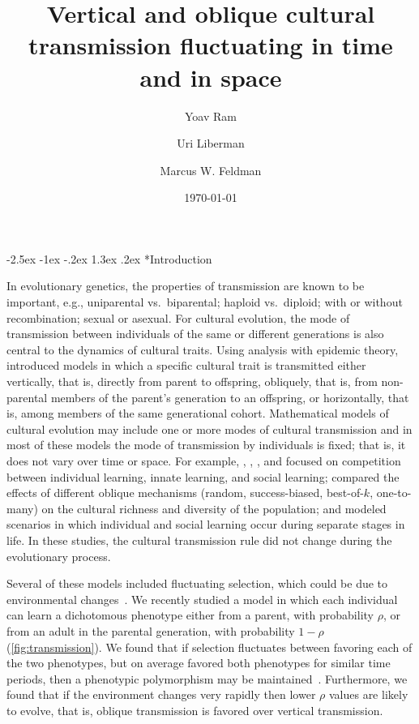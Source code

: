 \documentclass[14pt]{extarticle}
\title{Vertical and oblique cultural transmission fluctuating in time and in space}
\author[a]{Yoav Ram}
\author[b]{Uri Liberman}
\author[a]{Marcus W. Feldman}
\affil[a]{Department of Biology, Stanford University, Stanford, CA}
\affil[b]{School of Mathematical Sciences, Tel Aviv University, Israel}
\date{\today}
\makeatletter
\renewcommand\section{\@startsection {section}{1}{\z@}%
     {-2.5ex \@plus -1ex \@minus -.2ex}%
     {1.3ex \@plus.2ex}%
    {\Large\bfseries}}
\makeatother
\begin{document}
\maketitle


\section*{Introduction}

In evolutionary genetics, the properties of transmission are known to be important, e.g., uniparental vs.\ biparental; haploid vs.\ diploid; with or without recombination; sexual or asexual. For cultural evolution, the mode of transmission between individuals of the same or different generations is also central to the dynamics of cultural traits.
Using analysis with epidemic theory, \citet[ch.~3]{Cavalli-Sforza1981}  introduced models in which a specific cultural trait is transmitted either vertically, that is, directly from parent to offspring, obliquely, that is, from non-parental members of the parent's generation to an offspring, or horizontally, that is, among members of the same generational cohort.
Mathematical models of cultural evolution may include one or more modes of cultural transmission and in most of these models the mode of transmission by individuals is fixed; that is, it does not vary over time or space.
For example, \cite{Feldman1996}, \cite{Wakano2004}, \cite{Aoki2005}, and \citet{McElreath2008} focused on competition between individual learning, innate learning, and social learning; \citet{Fogarty2017} compared the effects of different oblique mechanisms (random, success-biased, best-of-$k$, one-to-many) on the cultural richness and diversity of the population;  and \citet{Aoki2012} modeled scenarios in which individual and social learning occur during separate stages in life.
In these studies, the cultural transmission rule did not change during the evolutionary process.

Several of these models included fluctuating selection, which could be due to environmental changes~\citep[reviewed in][]{Aoki2014}. 
We recently studied a model in which each individual can learn a dichotomous phenotype either from a parent, with probability $\rho$, or from an adult in the parental generation, with probability $1-\rho$ (\autoref{fig:transmission}).
We found that if selection fluctuates between favoring each of the two phenotypes, but on average favored both phenotypes for similar time periods, then a phenotypic polymorphism may be maintained~\citep{Ram2018}.
Furthermore, we found that if the environment changes very rapidly then lower $\rho$ values are likely to evolve, that is, oblique transmission is favored over vertical transmission.
\end{document}
